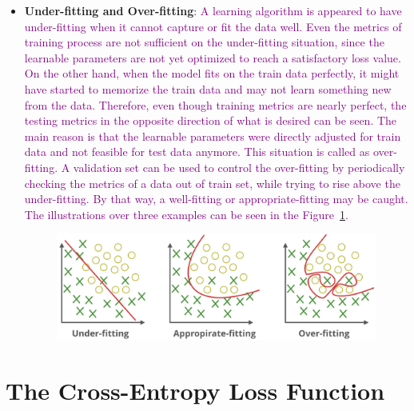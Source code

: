 \begin{itemize}
\item \textbf{Under-fitting and Over-fitting}: \textcolor{purple}{A learning algorithm is appeared to have under-fitting when it cannot capture or fit the data well. Even the metrics of training process are not sufficient on the under-fitting situation, since the learnable parameters are not yet optimized to reach a satisfactory loss value. On the other hand, when the model fits on the train data perfectly, it might have started to memorize the train data and may not learn something new from the data. Therefore, even though training metrics are nearly perfect, the testing metrics in the opposite direction of what is desired can be seen. The main reason is that the learnable parameters were directly adjusted for train data and not feasible for test data anymore. This situation is called as over-fitting. A validation set can be used to control the over-fitting by periodically checking the metrics of a data out of train set, while trying to rise above the under-fitting. By that way, a well-fitting or appropriate-fitting may be caught. The illustrations over three examples can be seen in the Figure~\ref{fig:underfitting_overfitting}.}
\begin{figure}[h]
\centering
\includegraphics[width=1\linewidth]{fig/underfitting_overfitting.png}
\vspace*{1mm}
\label{fig:underfitting_overfitting}
\end{figure}

\end{itemize}

\section{The Cross-Entropy Loss Function}\label{sec:CH3_cross_entropy}

